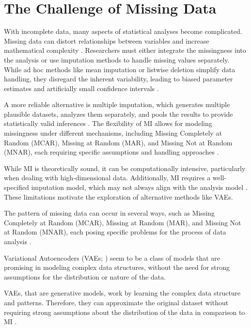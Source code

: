 \documentclass[10pt, a4paper]{article}
\begin{document}
\section{The Challenge of Missing Data}

With incomplete data, many aspects of statistical analyses become complicated. Missing data can distort relationships between variables and increase mathematical complexity \parencite{LittleRubin2019}. Researchers must either integrate the missingness into the analysis or use imputation methods to handle missing values separately. While ad hoc methods like mean imputation or listwise deletion simplify data handling, they disregard the inherent variability, leading to biased parameter estimates and artificially small confidence intervals \parencite{Enders2017}.

A more reliable alternative is multiple imputation, which generates multiple plausible datasets, analyzes them separately, and pools the results to provide statistically valid inferences \parencite{Rubin1987}. The flexibility of MI allows for modeling missingness under different mechanisms, including Missing Completely at Random (MCAR), Missing at Random (MAR), and Missing Not at Random (MNAR), each requiring specific assumptions and handling approaches \parencite{Nakagawa2015}.

While MI is theoretically sound, it can be computationally intensive, particularly when dealing with high-dimensional data. Additionally, MI requires a well-specified imputation model, which may not always align with the analysis model \parencite{Meng1994}. These limitations motivate the exploration of alternative methods like VAEs.

The pattern of missing data can occur in several ways, such as Missing Completely at Random (MCAR), Missing at Random (MAR), and Missing Not at Random (MNAR), each posing specific problems for the process of data analysis \parencite{Michael 2020, Rubin 2020}.  

Variational Autoencoders (VAEs; \parencite{Kingma 2013}) seem to be a class of models that are promising in modeling complex data structures, without the need for strong assumptions for the distribution or nature of the data.  

VAEs, that are generative models, work by learning the complex data structure and patterns. Therefore, they can approximate the original dataset without requiring strong assumptions about the distribution of the data in comparison to MI \parencite{Qui 2020}.  
\end{document}
